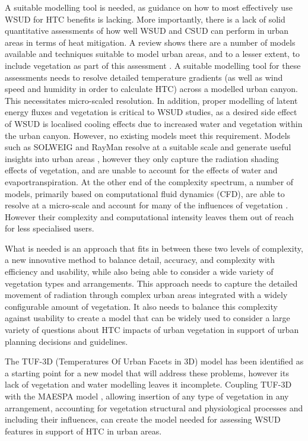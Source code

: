 \documentclass[preprint,12pt,authoryear]{elsarticle}
\begin{document}
A suitable modelling tool is needed, as guidance on how to most effectively use WSUD for HTC benefits is lacking. More importantly, there is a lack of solid quantitative assessments of how well WSUD and CSUD can perform in urban areas in terms of heat mitigation. A review shows there are a number of models available and techniques suitable to model urban areas, and to a lesser extent, to include vegetation as part of this assessment \citep{Nice2016}. A suitable modelling tool for these assessments needs to resolve detailed temperature gradients (as well as wind speed and humidity in order to calculate HTC) across a modelled urban canyon. This necessitates micro-scaled resolution. In addition, proper modelling of latent energy fluxes and vegetation is critical to WSUD studies, as a desired side effect of WSUD is localised cooling effects due to increased water and vegetation within the urban canyon. However, no existing models meet this requirement. Models such as SOLWEIG \citep{SOLWEIG2011} and RayMan \citep{Matzarakis2007,Matzarakis2010} resolve at a suitable scale and generate useful insights into urban areas \citep{Chen2014a}, however they only capture the radiation shading effects of vegetation, and are unable to account for the effects of water and evaportranspiration. At the other end of the complexity spectrum, a number of models, primarily based on computational fluid dynamics (CFD), are able to resolve at a micro-scale and account for many of the influences of vegetation \citep{Bailey2014,Bailey2016,Kunz2000,Schlunzen2011a,Yamada2011,Bruse1999}. However their complexity and computational intensity leaves them out of reach for less specialised users.

What is needed is an approach that fits in between these two levels of complexity, a new innovative method to balance detail, accuracy, and complexity with efficiency and usability, while also being able to consider a wide variety of vegetation types and arrangements. This approach needs to capture the detailed movement of radiation through complex urban areas integrated with a widely configurable amount of vegetation. It also needs to balance this complexity against usability to create a model that can be widely used to consider a large variety of questions about HTC impacts of urban vegetation in support of urban planning decisions and guidelines. 

The TUF-3D (Temperatures Of Urban Facets in 3D) model \citep{Krayenhoff2007} has been identified as a starting point for a new model that will address these problems, however its lack of vegetation and water modelling leaves it incomplete. Coupling TUF-3D with the MAESPA model \citep{Duursma2012}, allowing insertion of any type of vegetation in any arrangement, accounting for vegetation structural and physiological processes and including their influences, can create the model needed for assessing WSUD features in support of HTC in urban areas.
\end{document}
